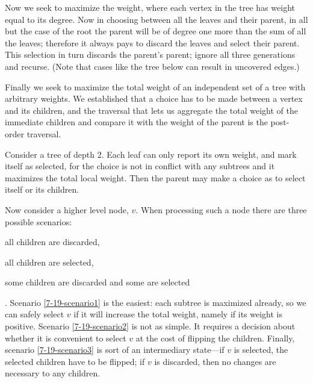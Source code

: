\documentclass{report}
\begin{document}
\smallskip

Now we seek to maximize the weight, where each vertex in the tree has weight equal to its degree. Now in choosing between all the leaves and their parent, in all but the case of the root the parent will be of degree one more than the sum of all the leaves; therefore it always pays to discard the leaves and select their parent. This selection in turn discards the parent's parent; ignore all three generations and recurse. (Note that cases like the tree below can result in uncovered edges.)

\begin{center}
\end{center}

Finally we seek to maximize the total weight of an independent set of a tree with arbitrary weights. We established that a choice has to be made between a vertex and its children, and the traversal that lets us aggregate the total weight of the immediate children and compare it with the weight of the parent is the post-order traversal.

Consider a tree of depth 2. Each leaf can only report its own weight, and mark itself as selected, for the choice is not in conflict with any subtrees and it maximizes the total local weight. Then the parent may make a choice as to select itself or its children.

Now consider a higher level node, $v$. When processing such a node there are three possible scenarios: \begin{enumerate*}[label=\arabic*)]
\item all children are discarded, \label{7-19-scenario1}
\item all children are selected, \label{7-19-scenario2}
\item some children are discarded and some are selected\label{7-19-scenario3}
\end{enumerate*}.
Scenario \ref{7-19-scenario1} is the easiest: each subtree is maximized already, so we can safely select $v$ if it will increase the total weight, namely if its weight is positive. Scenario \ref{7-19-scenario2} is not as simple. It requires a decision about whether it is convenient to select $v$ at the cost of flipping the children. Finally, scenario \ref{7-19-scenario3} is sort of an intermediary state---if $v$ is selected, the selected children have to be flipped; if $v$ is discarded, then no changes are necessary to any children.
\end{document}
